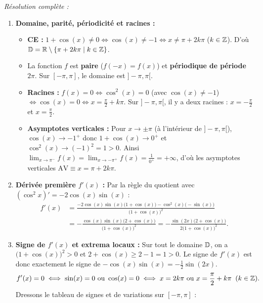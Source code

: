 \begin{exemple}
\emph{Résolution complète :}
\begin{enumerate}[label=\alph*)]
    \item \textbf{Domaine, parité, périodicité et racines :}
    \begin{itemize}
        \item \textbf{CE :} $1 + \cos(x) \neq 0 \iff \cos(x) \neq -1 \iff x \neq \pi + 2k\pi$ ($k \in \mathbb{Z}$). D'où $\mathbb{D} = \mathbb{R} \setminus \{\pi + 2k\pi \mid k \in \mathbb{Z}\}$.
        \item La fonction $f$ est \textbf{paire} ($f(-x) = f(x)$) et \textbf{périodique de période $2\pi$}. Sur $[-\pi, \pi]$, le domaine est $]-\pi, \pi[$.
        \item \textbf{Racines :} $f(x) = 0 \iff \cos^2(x) = 0$ (avec $\cos(x) \neq -1$) $\iff \cos(x) = 0 \iff x = \frac{\pi}{2} + k\pi$. Sur $]-\pi, \pi[$, il y a deux racines : $x = -\frac{\pi}{2}$ et $x = \frac{\pi}{2}$.
        \item \textbf{Asymptotes verticales :} Pour $x \to \pm\pi$ (à l'intérieur de $]-\pi, \pi[$), $\cos(x) \to -1^+$ donc $1 + \cos(x) \to 0^+$ et $\cos^2(x) \to (-1)^2 = 1 > 0$. Ainsi $\lim_{x \to \pi^-} f(x) = \lim_{x \to -\pi^+} f(x) = \frac{1}{0^+} = +\infty$, d'où les asymptotes verticales $\text{AV} \equiv x = \pi + 2k\pi$.
    \end{itemize}
    \item \textbf{Dérivée première $f'(x)$ :} Par la règle du quotient avec $(\cos^2 x)' = -2\cos(x)\sin(x)$ :
    \begin{align*}
        f'(x) &= \frac{-2\cos(x)\sin(x)\bigl(1+\cos(x)\bigr) - \cos^2(x)\bigl(-\sin(x)\bigr)}{\bigl(1+\cos(x)\bigr)^2} \\
        &= \boxed{-\frac{\cos(x)\sin(x)\bigl(2 + \cos(x)\bigr)}{\bigl(1+\cos(x)\bigr)^2}} = -\frac{\sin(2x)\bigl(2+\cos(x)\bigr)}{2\bigl(1+\cos(x)\bigr)^2}.
    \end{align*}
    \item \textbf{Signe de $f'(x)$ et extrema locaux :} Sur tout le domaine $\mathbb{D}$, on a $\bigl(1+\cos(x)\bigr)^2 > 0$ et $2 + \cos(x) \ge 2 - 1 = 1 > 0$. Le signe de $f'(x)$ est donc exactement le signe de $-\cos(x)\sin(x) = -\frac{1}{2}\sin(2x)$.
    \[
        f'(x) = 0 \iff \sin(x) = 0 \text{ ou } \cos(x) = 0 \iff x = 2k\pi \text{ ou } x = \frac{\pi}{2} + k\pi \;\; (k \in \mathbb{Z}).
    \]
    Dressons le tableau de signes et de variations sur $[-\pi, \pi]$ :
    \begin{center}
    {\small
    \renewcommand{\arraystretch}{1.35}
    \setlength{\tabcolsep}{4pt}
    \begin{tabular}{|c||c|c|c|c|c|c|c|c|c|}

\end{tabular}}
\end{center}
\end{enumerate}
\end{exemple}
